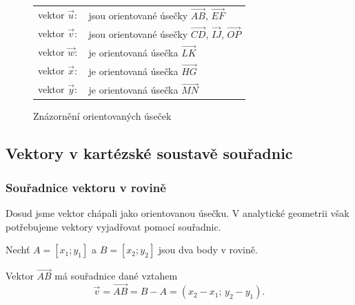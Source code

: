 \begin{example}
\begin{figure}[H]

        \begin{tabular}{ll}
            vektor $\vec{u}:$ &jsou orientované úsečky $\overrightarrow{AB}$, $\overrightarrow{EF}$ \\
            vektor $\vec{v}:$ &jsou orientované úsečky $\overrightarrow{CD}$, $\overrightarrow{IJ}$, $\overrightarrow{OP}$ \\
            vektor $\vec{w}:$ &je orientovaná úsečka $\overrightarrow{LK}$ \\
            vektor $\vec{x}:$ &je orientovaná úsečka $\overrightarrow{HG}$ \\
            vektor $\vec{y}:$ &je orientovaná úsečka $\overrightarrow{MN}$ \\            
        \end{tabular}
        \caption{Znázornění orientovaných úseček}
        \label{fig:oriented_segments}
    \end{figure}
\end{example}


\subsection{Vektory v kartézské soustavě souřadnic}\label{subsec:Vectors_in_cartesian_coordinate_system} 
\subsubsection{Souřadnice vektoru v rovině}\label{subsubsec:Coordinates_of_vector_in_plane}

Dosud jsme vektor chápali jako orientovanou úsečku.
V analytické geometrii však potřebujeme vektory vyjadřovat pomocí souřadnic.

Nechť $A = [x_1; y_1]$ a $B = [x_2; y_2]$ jsou dva body v rovině.

\begin{definition}\label{def:vector_coordinates}
    Vektor $\overrightarrow{AB}$ má souřadnice dané vztahem
    \begin{equation}\label{eq:vector_coordinates}
        \vec{v} = \overrightarrow{AB} = B - A = (x_2 - x_1;\, y_2 - y_1).
    \end{equation}
\end{definition}

